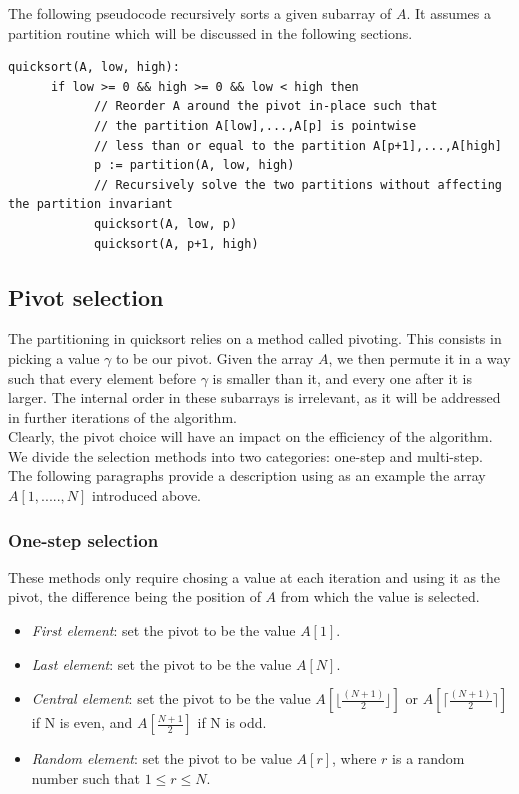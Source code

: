 \documentclass[]{finalproject}
\begin{document}
The following pseudocode recursively sorts a given subarray of $A$. It assumes a partition routine which will be discussed in the following sections.

\begin{verbatim}
quicksort(A, low, high):
      if low >= 0 && high >= 0 && low < high then
            // Reorder A around the pivot in-place such that
            // the partition A[low],...,A[p] is pointwise
            // less than or equal to the partition A[p+1],...,A[high]
            p := partition(A, low, high)
            // Recursively solve the two partitions without affecting the partition invariant
            quicksort(A, low, p)
            quicksort(A, p+1, high)
\end{verbatim}

\subsection{Pivot selection}
The partitioning in quicksort relies on a method called pivoting. This consists in picking a value $\gamma$ to be our pivot. Given the array $A$, we then permute it in a way such that every element before $\gamma$ is smaller than it, and every one after it is larger. The internal order in these subarrays is irrelevant, as it will be addressed in further iterations of the algorithm.\\
Clearly, the pivot choice will have an impact on the efficiency of the algorithm. We divide the selection methods into two categories: one-step and multi-step.\\
The following paragraphs provide a description using as an example the array $A[1,.....,N]$ introduced above.

\subsubsection{One-step selection}
These methods only require chosing a value at each iteration and using it as the pivot, the difference being the position of $A$ from which the value is selected.

\begin{itemize}
\item{\textit{First element}}: set the pivot to be the value $A[1]$.
\item{\textit{Last element}}: set the pivot to be the value $A[N]$.
\item{\textit{Central element}}: set the pivot to be the value $A[\lfloor \frac{(N+1)}{2} \rfloor]$ or $A[\lceil \frac{(N+1)}{2} \rceil]$ if N is even, and $A[\frac{N+1}{2}]$ if N is odd.
\item{\textit{Random element}}: set the pivot to be value $A[r]$, where $r$ is a random number such that $1 \leq r \leq N$.
\end{itemize}
\end{document}
